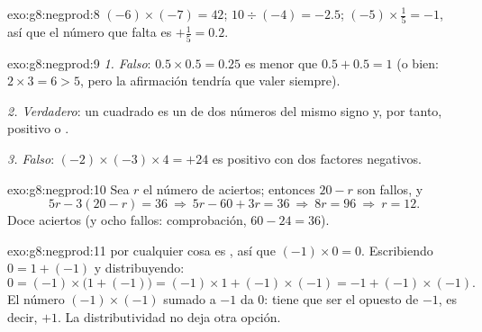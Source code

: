 \begin{solution}{exo:g8:negprod:8}
$(-6) \times (-7) = 42$; \quad
$10 \div (-4) = -2.5$; \quad
$(-5) \times \frac15 = -1$, así que el número que falta es
$+\frac15 = 0.2$.
\end{solution}

\begin{solution}{exo:g8:negprod:9}
\emph{1. Falso}: $0.5 \times 0.5 = 0.25$ es menor que
$0.5 + 0.5 = 1$ (o bien: $2 \times 3 = 6 > 5$, pero la afirmación tendría que valer
siempre).

\emph{2. Verdadero}: un cuadrado es un  de dos números del mismo
signo y, por tanto, positivo o .

\emph{3. Falso}: $(-2) \times (-3) \times 4 = +24$ es positivo con
dos factores negativos.
\end{solution}

\begin{solution}{exo:g8:negprod:10}
Sea $r$ el número de aciertos; entonces $20 - r$ son fallos, y
\[
5r - 3(20 - r) = 36
\ \Longrightarrow\
5r - 60 + 3r = 36
\ \Longrightarrow\
8r = 96
\ \Longrightarrow\
r = 12 .
\]
Doce aciertos (y ocho fallos: comprobación,
$60 - 24 = 36$).
\end{solution}

\begin{solution}{exo:g8:negprod:11}
 por cualquier cosa es , así que $(-1) \times 0 = 0$. Escribiendo
$0 = 1 + (-1)$ y distribuyendo:
\[
0 = (-1) \times \bigl(1 + (-1)\bigr)
= (-1) \times 1 + (-1) \times (-1)
= -1 + (-1) \times (-1).
\]
El número $(-1) \times (-1)$ sumado a $-1$ da $0$: tiene que ser el
opuesto de $-1$, es decir, $+1$. La distributividad no deja otra
opción.
\end{solution}

